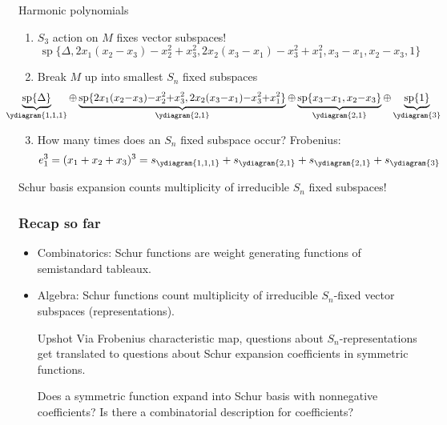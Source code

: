 \documentclass{beamer}
\renewcommand{\Span}{\operatorname{sp}}
\newcounter{c}
\begin{document}
\begin{frame}{Harmonic polynomials}
  \begin{enumerate}
  \item \(S_3\) action on \(M\) fixes vector subspaces!
  \[
\Span\{\Delta, 2x_1(x_2-x_3)-x_2^2+x_3^2,
            2x_2(x_3-x_1)-x_3^2+x_1^2, 
       x_3-x_1, x_2-x_3,1\}
  \]\pause 
\item Break \(M\) up into smallest \(S_n\) fixed subspaces \pause
  \[
    \hspace{-2.9em}
    \scalebox{0.95}{\(
      \underbrace{\Span\{\Delta\}}_{\ydiagram{1,1,1}} {\oplus} \underbrace{\Span\{2x_1(x_2{-}x_3){-}x_2^2{+}x_3^2,
        2x_2(x_3{-}x_1){-}x_3^2{+}x_1^2\}}_{\ydiagram{2,1}} {\oplus}
      \underbrace{\Span\{x_3{-}x_1, x_2{-}x_3\}}_{\ydiagram{2,1}} {\oplus} \underbrace{\Span\{1\}}_{\ydiagram{3}}\)}
  \]\pause
  \item How many times does an \(S_n\) fixed subspace occur? \pause
    Frobenius: \pause
    \[
      e_1^3 = (x_1+x_2+x_3)^3 = s_{\ydiagram{1,1,1}} + s_{\ydiagram{2,1}} +
      s_{\ydiagram{2,1}} + s_{\ydiagram{3}}
    \]
  \end{enumerate}
  \pause
  Schur basis expansion counts multiplicity of irreducible \(S_n\)
  fixed subspaces!
\end{frame}
\begin{frame}
 \frametitle{Recap so far} 
 \begin{itemize}
 \item Combinatorics: Schur functions are weight generating functions
   of semistandard tableaux.\pause
 \item Algebra: Schur functions count multiplicity of irreducible
   \(S_n\)-fixed vector subspaces (representations).\pause
  \begin{block}{Upshot}
    Via Frobenius characteristic map, questions about
      \(S_n\)-representations get translated to questions
      about Schur expansion coefficients in symmetric functions.
  \end{block}\pause
  Does a symmetric function expand into Schur basis with nonnegative
  coefficients?
  Is there a combinatorial description for coefficients?
 \end{itemize}
\end{frame}
\end{document}

